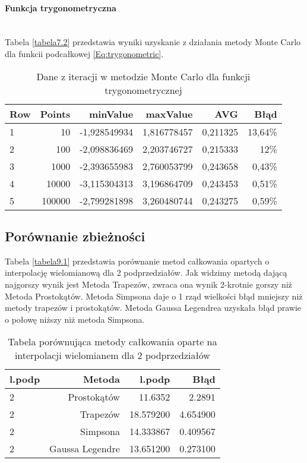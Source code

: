 \documentclass[12pt,twoside]{article}
\begin{document}
\paragraph{Funkcja trygonometryczna}\mbox{} \\

Tabela \eqref{tabela7.2} przedstawia wyniki uzyskanie z działania metody Monte Carlo dla funkcii podcałkowej \eqref{Eq:trygonometric}.

\begin{table}[H]
\centering 
\caption{Dane z iteracji w metodzie Monte Carlo dla funkcji trygonometrycznej}
\label{tabela7.2}
\begin{tabular}{lrrrrr}
\toprule
{Row} &  Points &  minValue &  maxValue &       AVG &      Błąd \\
\midrule
1  &     10 & -1,928549934 &   1,816778457 & 0,211325 & 13,64\% \\
2  &     100 & -2,098836469 &  2,203746727 & 0,215333 & 12\% \\
3  &     1000 & -2,393655983 &   2,760053799 & 0,243658 & 0,43\% \\
4  &     10000 & -3,115304313 &  3,196864709 & 0,243453 & 0,51\% \\
5  &     100000 & -2,799281898 &  3,260480744 & 0,243275 & 0,59\% \\
\bottomrule
\end{tabular}
\end{table}

\clearpage

\subsection{Porównanie zbieżności}

Tabela \eqref{tabela9.1} przedstawia porównanie metod całkowania opartych o interpolację wielomianową dla 2 podprzedziałów.
Jak widzimy metodą dającą najgorszy wynik jest Metoda Trapezów, zwraca ona wynik 2-krotnie gorszy niż Metoda Prostokątów. 
Metoda Simpsona daje o 1 rząd wielkości błąd mniejszy niż metody trapezów i prostokątów. 
Metoda Gaussa Legendrea uzyskała błąd prawie o połowę niższy niż metoda Simpsona.

\begin{table}[h]
\centering 
\caption{Tabela porównująca metody całkowania oparte na interpolacji wielomianem dla 2 podprzedziałów }
\label{tabela9.1}
\begin{tabular}{lrrr}
\toprule
{l.podp} & Metoda &  l.podp &  Błąd \\
\midrule
2  &     Prostokątów & 11.6352 &   2.2891  \\
2  &     Trapezów & 18.579200 &  4.654900  \\
2  &     Simpsona & 14.333867 &   0.409567  \\
2  &     Gaussa Legendre & 13.651200 &  0.273100  \\
\bottomrule
\end{tabular}
\end{table}
\end{document}
